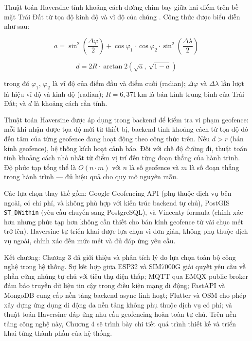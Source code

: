 \documentclass[../DoAn.tex]{subfiles}
\begin{document}
Thuật toán Haversine tính khoảng cách đường chim bay giữa hai điểm trên bề mặt Trái Đất từ tọa độ kinh độ và vĩ độ của chúng \cite{haversine_formula}. Công thức được biểu diễn như sau:

\begin{equation}
a = \sin^2\!\left(\frac{\Delta\varphi}{2}\right) + \cos\varphi_1 \cdot \cos\varphi_2 \cdot \sin^2\!\left(\frac{\Delta\lambda}{2}\right)
\label{eq:haversine_a}
\end{equation}

\begin{equation}
d = 2R \cdot \arctan2\!\left(\sqrt{a},\, \sqrt{1-a}\right)
\label{eq:haversine_d}
\end{equation}

\noindent trong đó $\varphi_1$, $\varphi_2$ là vĩ độ của điểm đầu và điểm cuối (radian); $\Delta\varphi$ và $\Delta\lambda$ lần lượt là hiệu vĩ độ và kinh độ (radian); $R = 6{,}371$\,km là bán kính trung bình của Trái Đất; và $d$ là khoảng cách cần tính.

Thuật toán Haversine được áp dụng trong backend để kiểm tra vi phạm geofence: mỗi khi nhận được tọa độ mới từ thiết bị, backend tính khoảng cách từ tọa độ đó đến tâm của từng geofence đang hoạt động theo công thức trên. Nếu $d > r$ (bán kính geofence), hệ thống kích hoạt cảnh báo. Đối với chế độ đường đi, thuật toán tính khoảng cách nhỏ nhất từ điểm vị trí đến từng đoạn thẳng của hành trình. Độ phức tạp tổng thể là $O(n \cdot m)$ với $n$ là số geofence và $m$ là số đoạn thẳng trong hành trình — đủ hiệu quả cho quy mô nguyên mẫu.

Các lựa chọn thay thế gồm: Google Geofencing API (phụ thuộc dịch vụ bên ngoài, có chi phí, và không phù hợp với kiến trúc backend tự chủ), PostGIS \texttt{ST\_DWithin} (yêu cầu chuyển sang PostgreSQL), và Vincenty formula (chính xác hơn nhưng phức tạp hơn không cần thiết cho bán kính geofence từ vài chục mét trở lên). Haversine tự triển khai được lựa chọn vì đơn giản, không phụ thuộc dịch vụ ngoài, chính xác đến mức mét và đủ đáp ứng yêu cầu.

Kết chương: Chương 3 đã giới thiệu và phân tích lý do lựa chọn toàn bộ công nghệ trong hệ thống. Sự kết hợp giữa ESP32 và SIM7000G giải quyết yêu cầu về phần cứng nhúng tự chủ với tiêu thụ điện thấp; MQTT qua EMQX public broker đảm bảo truyền dữ liệu tin cậy trong điều kiện mạng di động; FastAPI và MongoDB cung cấp nền tảng backend async linh hoạt; Flutter và OSM cho phép xây dựng ứng dụng di động đa nền tảng không phụ thuộc dịch vụ có phí; và thuật toán Haversine đáp ứng nhu cầu geofencing hoàn toàn tự chủ. Trên nền tảng công nghệ này, Chương 4 sẽ trình bày chi tiết quá trình thiết kế và triển khai từng thành phần của hệ thống.
\end{document}
